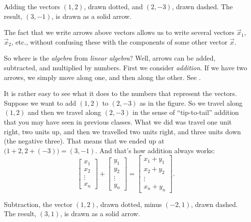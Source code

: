 \documentclass{ximera}
\begin{document}
\begin{mywrapfig}[15]{3.25in}
    \capstart
    
    \caption{Adding the vectors $(1,2)$, drawn dotted, and $(2,-3)$, drawn dashed.  The result, $(3,-1)$, is drawn as a solid arrow.\label{linalg-vecadd:fig}}
\end{mywrapfig}

The fact that we write arrows above vectors allows us to write several vectors $\vec{x}_1$, $\vec{x}_2$, etc., without confusing these with the components of some other vector $\vec{x}$.

So where is the \emph{algebra} from \emph{linear algebra}? Well, arrows can be added, subtracted, and multiplied by numbers. First we consider \emph{addition}. If we have two arrows, we simply move along one, and then along the other.  See .

It is rather easy to see what it does to the numbers that represent the vectors.  Suppose we want to add $(1,2)$ to $(2,-3)$ as in the figure. So we travel along $(1,2)$ and then we travel along $(2,-3)$ in the sense of ``tip-to-tail'' addition that you may have seen in previous classes. What we did was travel one unit right, two units up, and then we travelled two units right, and three units down (the negative three).  That means that we ended up at $\bigl(1+2,2+(-3)\bigr) = (3,-1)$. And that's how addition always works:
\begin{equation*}
    \begin{bmatrix}
        x_{1} \\ x_2 \\ \vdots \\ x_n
    \end{bmatrix} +
    \begin{bmatrix}
        y_{1} \\ y_2 \\ \vdots \\ y_n
    \end{bmatrix} =
    \begin{bmatrix}
        x_1 + y_{1} \\ x_2+ y_2 \\ \vdots \\ x_n + y_n
    \end{bmatrix} .
\end{equation*}

\begin{mywrapfig}[13]{3.25in}
    \capstart
    
    \caption{Subtraction, the vector $(1,2)$, drawn dotted, minus $(-2,1)$, drawn dashed.  The result, $(3,1)$, is drawn as a solid arrow.\label{linalg-vecsub:fig}}
\end{mywrapfig}
\end{document}
